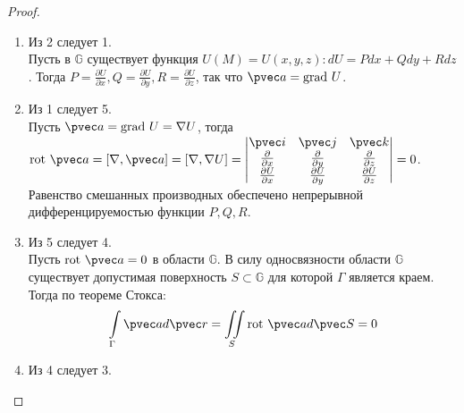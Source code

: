 \begin{proof}
  \begin{enumerate}
    \item Из 2 следует 1. \\

      Пусть в $\mathbb{G}$ существует функция $U(M) = U(x, y, z): dU = Pdx +
      Qdy + Rdz$. Тогда $P = \frac{\partial U}{\partial x}, Q = \frac{\partial
      U}{\partial y}, R = \frac{\partial U}{\partial z}$, так что $\pvec a =
      \mbox{grad} \ U$.
    \item Из 1 следует 5. \\

      Пусть $\pvec a = \mbox{grad} \ U = \nabla U$, тогда $\mbox{rot} \ \pvec a
      = [\nabla, \pvec a] = [\nabla, \nabla U] = \begin{vmatrix}
        \pvec i & \pvec j & \pvec k \\
        \frac{\partial }{\partial x} & \frac{\partial }{\partial y} &
        \frac{\partial }{\partial z} \\
        \frac{\partial U}{\partial x} & \frac{\partial U}{\partial y} &
        \frac{\partial U}{\partial z}
      \end{vmatrix} = 0$. Равенство смешанных производных обеспечено
      непрерывной дифференцируемостью функции $P, Q, R$.
    \item Из 5 следует 4. \\

      Пусть $\mbox{rot} \ \pvec a = 0$ в области $\mathbb{G}$. В силу
      односвязности области $\mathbb{G}$ существует допустимая поверхность $S
      \subset \mathbb{G}$ для которой $\Gamma$ является краем. Тогда по теореме
      Стокса:
      \begin{gather*}
        \int\limits_{\Gamma} \pvec a d \pvec r = \iint\limits_S \mbox{rot} \
        \pvec a d \pvec S = 0
      \end{gather*}
    \item Из 4 следует 3. \\


\end{enumerate}
\end{proof}
